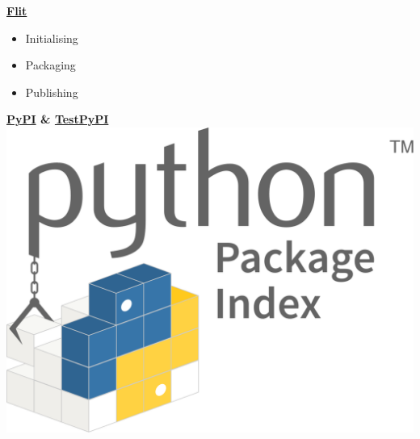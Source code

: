 \begin{frame}
    \centering
    
    \begin{multicols}{2}
        {\Large \textbf{\href{https://flit.readthedocs.io/en/latest/upload.html\#using-pypirc}{Flit}}}
        \begin{itemize}
            \item Initialising
            \item Packaging
            \item Publishing
        \end{itemize}

        \columnbreak
        \pause        
        {\Large \textbf{\href{https://pypi.org/}{PyPI} \& \href{https://test.pypi.org/}{TestPyPI}}}
        \includegraphics[scale=0.1]{Bin/pypi_logo.png}
    \end{multicols}

\end{frame}
